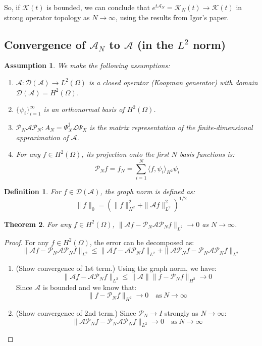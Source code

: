 \documentclass{article}[11]
\newtheorem{theorem}{Theorem}
\newtheorem{definition}[theorem]{Definition}
\newtheorem{assumption}{Assumption}
\begin{document}
	So, if $\mathcal{K}(t)$ is bounded, we can conclude that $e^{t \mathcal{A}_N} = \mathcal{K}_{N}(t) \to \mathcal{K}(t)$ in strong operator topology as $N \to \infty$, using the results from Igor's paper.
	
	\newpage
	\subsection{Convergence of \(\mathcal{A}_N\) to \(\mathcal{A}\) (in the \(L^2\) norm)}
	
	\begin{assumption}
		We make the following assumptions:
		\begin{enumerate}
			\item \(\mathcal{A}: \mathcal{D}(\mathcal{A}) \to L^2(\Omega)\) is a closed operator (Koopman generator) with domain \(\mathcal{D}(\mathcal{A}) = H^2(\Omega)\).
			\item \(\{\psi_i\}_{i=1}^\infty\) is an orthonormal basis of \(H^2(\Omega)\).
			\item \(\mathcal{P}_N\mathcal{A}\mathcal{P}_N: A_N = \Psi^\dagger_X \mathcal{L}\Psi_X\) is the matrix representation of the finite-dimensional approximation of \(\mathcal{A}\).
			\item For any \(f \in H^2(\Omega)\), its projection onto the first \(N\) basis functions is:
			\[
			\mathcal{P}_N f = f_N = \sum_{i=1}^{N} \langle f, \psi_i \rangle_{H^2} \psi_i
			\]
		\end{enumerate}
	\end{assumption}
	
	\begin{definition}
		For \(f \in \mathcal{D}(\mathcal{A})\), the graph norm is defined as:
		\[
		\|f\|_0 = \left(\|f\|_{H^2}^2 + \|\mathcal{A} f\|_{L^2}^2\right)^{1/2}
		\]
	\end{definition}
	
	\begin{theorem}
		For any \(f \in H^2(\Omega)\), \( \|\mathcal{A} f - \mathcal{P}_N\mathcal{A}\mathcal{P}_N f\|_{L^2} \to 0 \) as \(N \to \infty\).
	\end{theorem}
	\begin{proof}
		For any \(f \in H^2(\Omega)\), the error can be decomposed as:
		\[
		\|\mathcal{A}f - \mathcal{P}_N\mathcal{A}\mathcal{P}_N f\|_{L^2} \leq \|\mathcal{A}f - \mathcal{A}\mathcal{P}_N f\|_{L^2} + \|\mathcal{A}\mathcal{P}_N f - \mathcal{P}_N\mathcal{A}\mathcal{P}_N f\|_{L^2}
		\]
		\begin{enumerate}
			\item (Show convergence of 1st term.) Using the graph norm, we have:
			\[
			\|\mathcal{A}f - \mathcal{A}\mathcal{P}_N f\|_{L^2} \leq \|\mathcal{A}\| \|f - \mathcal{P}_N f\|_{H^2} \to 0
			\]
			Since \(\mathcal{A}\) is bounded and we know that:
			\[
			\|f - \mathcal{P}_N f\|_{H^2} \to 0 \quad \text{as} \ N \to \infty
			\]
			\item (Show convergence of 2nd term.) Since $\mathcal{P}_N \to I$ strongly as $N \to \infty$:
			\[
			\|\mathcal{A}\mathcal{P}_N f - \mathcal{P}_N\mathcal{A}\mathcal{P}_N f\|_{L^2} \to 0 \quad \text{as} \ N \to \infty
			\]
		\end{enumerate}
	\end{proof}
	
\end{document}
